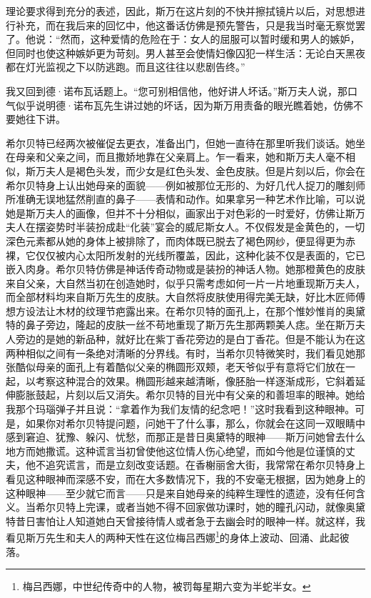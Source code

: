 \par 理论要求得到充分的表述，因此，斯万在这片刻的不快并擦拭镜片以后，对思想进行补充，而在我后来的回忆中，他这番话仿佛是预先警告，只是我当时毫无察觉罢了。他说：“然而，这种爱情的危险在于：女人的屈服可以暂时缓和男人的嫉妒，但同时也使这种嫉妒更为苛刻。男人甚至会使情妇像囚犯一样生活：无论白天黑夜都在灯光监视之下以防逃跑。而且这往往以悲剧告终。”
\par 我又回到德·诺布瓦话题上。“您可别相信他，他好讲人坏话。”斯万夫人说，那口气似乎说明德·诺布瓦先生讲过她的坏话，因为斯万用责备的眼光瞧着她，仿佛不要她往下讲。
\par 希尔贝特已经两次被催促去更衣，准备出门，但她一直待在那里听我们谈话。她坐在母亲和父亲之间，而且撒娇地靠在父亲肩上。乍一看来，她和斯万夫人毫不相似，斯万夫人是褐色头发，而少女是红色头发、金色皮肤。但是片刻以后，你会在希尔贝特身上认出她母亲的面貌——例如被那位无形的、为好几代人捉刀的雕刻师所准确无误地猛然削直的鼻子——表情和动作。如果拿另一种艺术作比喻，可以说她是斯万夫人的画像，但并不十分相似，画家出于对色彩的一时爱好，仿佛让斯万夫人在摆姿势时半装扮成赴“化装”宴会的威尼斯女人。不仅假发是金黄色的，一切深色元素都从她的身体上被排除了，而肉体既已脱去了褐色网纱，便显得更为赤裸，它仅仅被内心太阳所发射的光线所覆盖，因此，这种化装不仅是表面的，它已嵌入肉身。希尔贝特仿佛是神话传奇动物或是装扮的神话人物。她那橙黄色的皮肤来自父亲，大自然当初在创造她时，似乎只需考虑如何一片一片地重现斯万夫人，而全部材料均来自斯万先生的皮肤。大自然将皮肤使用得完美无缺，好比木匠师傅想方设法让木材的纹理节疤露出来。在希尔贝特的面孔上，在那个惟妙惟肖的奥黛特的鼻子旁边，隆起的皮肤一丝不苟地重现了斯万先生那两颗美人痣。坐在斯万夫人旁边的是她的新品种，就好比在紫丁香花旁边的是白丁香花。但是不能认为在这两种相似之间有一条绝对清晰的分界线。有时，当希尔贝特微笑时，我们看见她那张酷似母亲的面孔上有着酷似父亲的椭圆形双颊，老天爷似乎有意将它们放在一起，以考察这种混合的效果。椭圆形越来越清晰，像胚胎一样逐渐成形，它斜着延伸膨胀鼓起，片刻以后又消失。希尔贝特的目光中有父亲的和善坦率的眼神。她给我那个玛瑙弹子并且说：“拿着作为我们友情的纪念吧！”这时我看到这种眼神。可是，如果你对希尔贝特提问题，问她干了什么事，那么，你就会在这同一双眼睛中感到窘迫、犹豫、躲闪、忧愁，而那正是昔日奥黛特的眼神——斯万问她曾去什么地方而她撒谎。这种谎言当初曾使他这位情人伤心绝望，而如今他是位谨慎的丈夫，他不追究谎言，而是立刻改变话题。在香榭丽舍大街，我常常在希尔贝特身上看见这种眼神而深感不安，而在大多数情况下，我的不安毫无根据，因为她身上的这种眼神——至少就它而言——只是来自她母亲的纯粹生理性的遗迹，没有任何含义。当希尔贝特上完课，或者当她不得不回家做功课时，她的瞳孔闪动，就像奥黛特昔日害怕让人知道她白天曾接待情人或者急于去幽会时的眼神一样。就这样，我看见斯万先生和夫人的两种天性在这位梅吕西娜\footnote{梅吕西娜，中世纪传奇中的人物，被罚每星期六变为半蛇半女。}的身体上波动、回涌、此起彼落。
